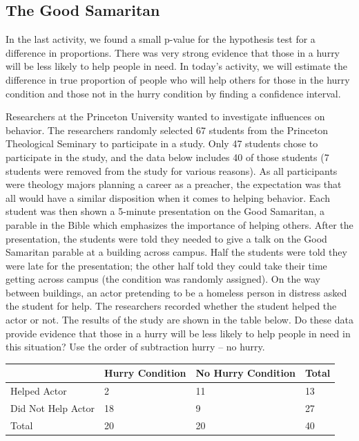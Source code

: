 \documentclass[
]{report}
\begin{document}
\hypertarget{the-good-samaritan-1}{%
\subsection{The Good Samaritan}\label{the-good-samaritan-1}}

In the last activity, we found a small p-value for the hypothesis test for a difference in proportions. There was very strong evidence that those in a hurry will be less likely to help people in need. In today's activity, we will estimate the difference in true proportion of people who will help others for those in the hurry condition and those not in the hurry condition by finding a confidence interval.

Researchers at the Princeton University wanted to investigate influences on behavior. The researchers randomly selected 67 students from the Princeton Theological Seminary to participate in a study. Only 47 students chose to participate in the study, and the data below includes 40 of those students (7 students were removed from the study for various reasons). As all participants were theology majors planning a career as a preacher, the expectation was that all would have a similar disposition when it comes to helping behavior. Each student was then shown a 5-minute presentation on the Good Samaritan, a parable in the Bible which emphasizes the importance of helping others. After the presentation, the students were told they needed to give a talk on the Good Samaritan parable at a building across campus. Half the students were told they were late for the presentation; the other half told they could take their time getting across campus (the condition was randomly assigned). On the way between buildings, an actor pretending to be a homeless person in distress asked the student for help. The researchers recorded whether the student helped the actor or not. The results of the study are shown in the table below. Do these data provide evidence that those in a hurry will be less likely to help people in need in this situation? Use the order of subtraction hurry -- no hurry.

\begin{longtable}[]{@{}llll@{}}
\toprule
& Hurry Condition & No Hurry Condition & Total \\
\midrule
\endhead
Helped Actor & 2 & 11 & 13 \\
Did Not Help Actor & 18 & 9 & 27 \\
Total & 20 & 20 & 40 \\
\bottomrule
\end{longtable}
\end{document}
